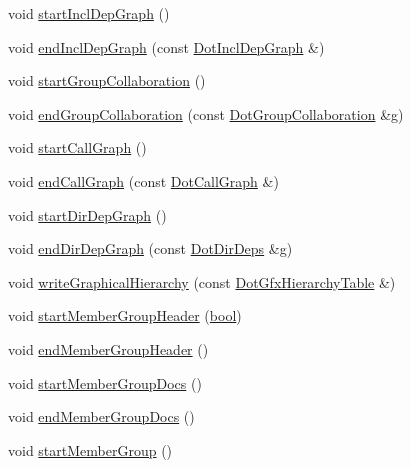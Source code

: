 \begin{DoxyCompactItemize}
\item 
void \hyperlink{class_r_t_f_generator_af71f39a74552eca540f9ce3ec6ecaaaf}{start\+Incl\+Dep\+Graph} ()
\item 
void \hyperlink{class_r_t_f_generator_a0d0f1c8866d426ab365991e625655294}{end\+Incl\+Dep\+Graph} (const \hyperlink{class_dot_incl_dep_graph}{Dot\+Incl\+Dep\+Graph} \&)
\item 
void \hyperlink{class_r_t_f_generator_a1cca2a1e8279bfe2a81c5c175f3e8a3e}{start\+Group\+Collaboration} ()
\item 
void \hyperlink{class_r_t_f_generator_a7da95182ca80804b84d0fcd6db5d1d2f}{end\+Group\+Collaboration} (const \hyperlink{class_dot_group_collaboration}{Dot\+Group\+Collaboration} \&\hyperlink{060__command__switch_8tcl_af08b4b5bfa9edf0b0a7dee1c2b2c29e0}{g})
\item 
void \hyperlink{class_r_t_f_generator_a337a29f3c9a3031dd9926d56be1a3732}{start\+Call\+Graph} ()
\item 
void \hyperlink{class_r_t_f_generator_ad99bf9b3a8b9221c89d0c8bb5e5665e5}{end\+Call\+Graph} (const \hyperlink{class_dot_call_graph}{Dot\+Call\+Graph} \&)
\item 
void \hyperlink{class_r_t_f_generator_ae1d2a7d98e8b0933b8000b7ba646fe08}{start\+Dir\+Dep\+Graph} ()
\item 
void \hyperlink{class_r_t_f_generator_ad8d3f8ef96f02dc4d0bb75e7ebd2a28e}{end\+Dir\+Dep\+Graph} (const \hyperlink{class_dot_dir_deps}{Dot\+Dir\+Deps} \&\hyperlink{060__command__switch_8tcl_af08b4b5bfa9edf0b0a7dee1c2b2c29e0}{g})
\item 
void \hyperlink{class_r_t_f_generator_ad14ce0697f892a9bac69cabf734fb057}{write\+Graphical\+Hierarchy} (const \hyperlink{class_dot_gfx_hierarchy_table}{Dot\+Gfx\+Hierarchy\+Table} \&)
\item 
void \hyperlink{class_r_t_f_generator_a4125302b52972a717fb8797da60d8124}{start\+Member\+Group\+Header} (\hyperlink{qglobal_8h_a1062901a7428fdd9c7f180f5e01ea056}{bool})
\item 
void \hyperlink{class_r_t_f_generator_a1f6522cf46fdbcbc824a04c981fe1561}{end\+Member\+Group\+Header} ()
\item 
void \hyperlink{class_r_t_f_generator_ac0a0b210fb4152a3b97c6374ee19c662}{start\+Member\+Group\+Docs} ()
\item 
void \hyperlink{class_r_t_f_generator_a2524bede1266f057580c80da775fae4d}{end\+Member\+Group\+Docs} ()
\item 
void \hyperlink{class_r_t_f_generator_ae91c2a65ed12a3deb00353aaa00501c8}{start\+Member\+Group} ()

\end{DoxyCompactItemize}

